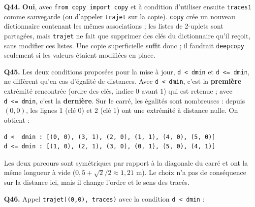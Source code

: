 \documentclass[11pt,a4paper]{article}
\begin{document}
\textbf{Q44.} \textbf{Oui}, avec \texttt{from\ copy\ import\ copy} et à condition d'utiliser ensuite \texttt{traces1} comme sauvegarde (ou d'appeler \texttt{trajet} sur la copie). \texttt{copy} crée un nouveau dictionnaire contenant les mêmes associations ; les listes de 2-uplets sont partagées, mais \texttt{trajet} ne fait que supprimer des clés du dictionnaire qu'il reçoit, sans modifier ces listes. Une copie superficielle suffit donc ; il faudrait \texttt{deepcopy} seulement si les valeurs étaient modifiées en place.

\textbf{Q45.} Les deux conditions proposées pour la mise à jour, \texttt{d\ \textless{}\ dmin} et \texttt{d\ \textless{}=\ dmin}, ne diffèrent qu'en cas d'égalité de distances. Avec \texttt{d\ \textless{}\ dmin}, c'est la \textbf{première} extrémité rencontrée (ordre des clés, indice 0 avant 1) qui est retenue ; avec \texttt{d\ \textless{}=\ dmin}, c'est la \textbf{dernière}. Sur le carré, les égalités sont nombreuses : depuis \((0,0)\), les lignes 1 (clé 0) et 2 (clé 1) ont une extrémité à distance nulle. On obtient :

\begin{lstlisting}
d <  dmin : [(0, 0), (3, 1), (2, 0), (1, 1), (4, 0), (5, 0)]
d <= dmin : [(1, 0), (2, 1), (3, 0), (0, 1), (5, 0), (4, 1)]
\end{lstlisting}

Les deux parcours sont symétriques par rapport à la diagonale du carré et ont la même longueur à vide (\(0{,}5 + \sqrt2/2 \approx 1{,}21\) m). Le choix n'a pas de conséquence sur la distance ici, mais il change l'ordre et le sens des tracés.

\textbf{Q46.} Appel \texttt{trajet(\allowbreak{}(\allowbreak{}0,\allowbreak{}0)\allowbreak{},\allowbreak{}\ traces)\allowbreak{}} avec la condition \texttt{d\ \textless{}\ dmin} :
\end{document}
